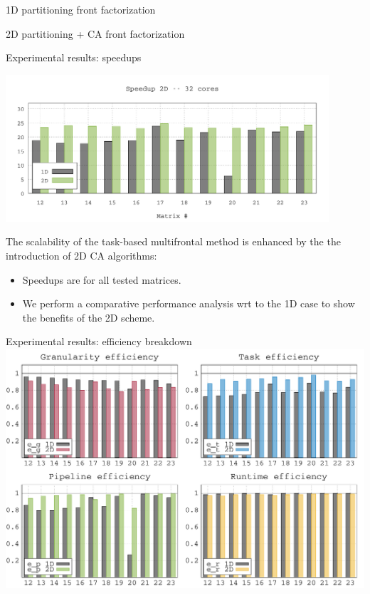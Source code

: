 \begin{frame}{1D partitioning front factorization}
  
\end{frame}

\begin{frame}{2D partitioning + CA front factorization}
  
\end{frame}

\begin{frame}{Experimental results: speedups}

  \begin{center}
    \includegraphics[width=0.9\textwidth]{data/su_ada_toms_2d}
  \end{center}

  The scalability of the task-based multifrontal method is enhanced by
  the the introduction of 2D CA algorithms:

  \begin{itemize}
  \item Speedups are  for all tested matrices.
  \item We perform a comparative performance analysis wrt to the 1D
    case to show the benefits of the 2D scheme. 
  \end{itemize}

\end{frame}

\begin{frame}{Experimental results: efficiency breakdown}
  \centering
  \includegraphics[width=\textwidth]{data/eff_profiles_2-2_2d}
\end{frame}

